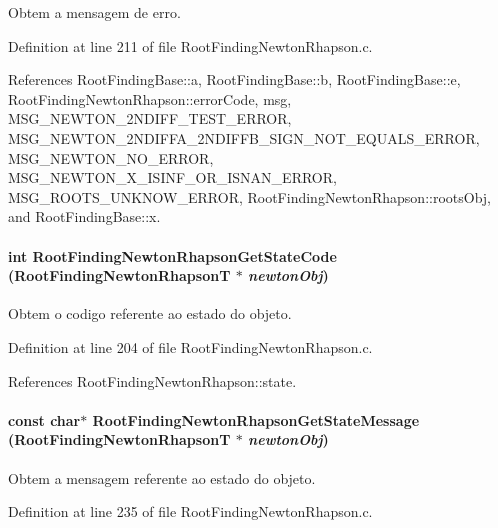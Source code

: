 Obtem a mensagem de erro. 



Definition at line 211 of file RootFindingNewtonRhapson.c.

References RootFindingBase::a, RootFindingBase::b, RootFindingBase::e, RootFindingNewtonRhapson::errorCode, msg, MSG\_\-NEWTON\_\-2NDIFF\_\-TEST\_\-ERROR, MSG\_\-NEWTON\_\-2NDIFFA\_\-2NDIFFB\_\-SIGN\_\-NOT\_\-EQUALS\_\-ERROR, MSG\_\-NEWTON\_\-NO\_\-ERROR, MSG\_\-NEWTON\_\-X\_\-ISINF\_\-OR\_\-ISNAN\_\-ERROR, MSG\_\-ROOTS\_\-UNKNOW\_\-ERROR, RootFindingNewtonRhapson::rootsObj, and RootFindingBase::x.\hypertarget{group____newton_g9d87a4beccc7b61365f6b680fc1a4355}{
\paragraph[RootFindingNewtonRhapsonGetStateCode]{\setlength{\rightskip}{0pt plus 5cm}int RootFindingNewtonRhapsonGetStateCode ({\bf RootFindingNewtonRhapsonT} $\ast$ {\em newtonObj})}\hfill}
\label{group____newton_g9d87a4beccc7b61365f6b680fc1a4355}


Obtem o codigo referente ao estado do objeto. 



Definition at line 204 of file RootFindingNewtonRhapson.c.

References RootFindingNewtonRhapson::state.\hypertarget{group____newton_g70436f650ac07866bb8d9897908f4422}{
\paragraph[RootFindingNewtonRhapsonGetStateMessage]{\setlength{\rightskip}{0pt plus 5cm}const char$\ast$ RootFindingNewtonRhapsonGetStateMessage ({\bf RootFindingNewtonRhapsonT} $\ast$ {\em newtonObj})}\hfill}
\label{group____newton_g70436f650ac07866bb8d9897908f4422}


Obtem a mensagem referente ao estado do objeto. 



Definition at line 235 of file RootFindingNewtonRhapson.c.

